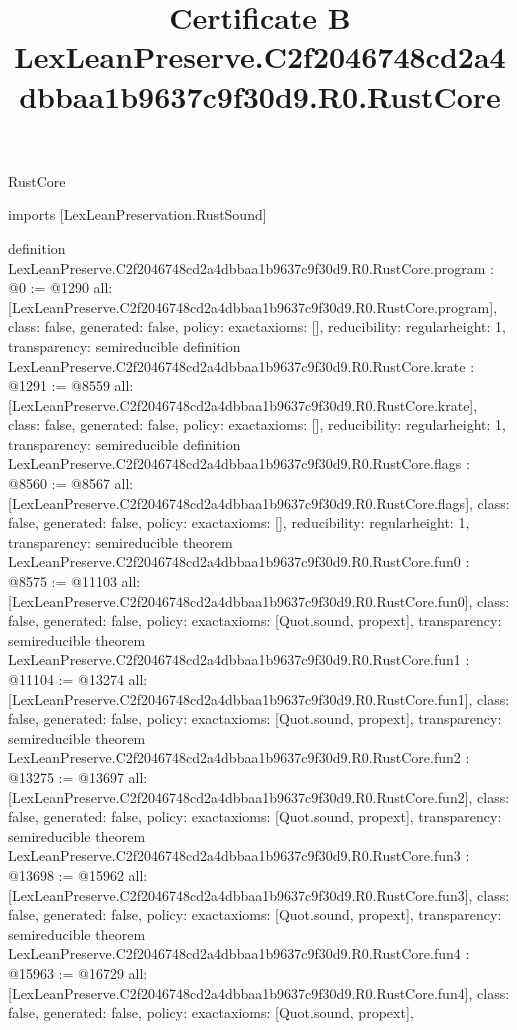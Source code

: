 \begin{lexlean}{RustCore}
\title{Certificate B LexLeanPreserve.C2f2046748cd2a4dbbaa1b9637c9f30d9.R0.RustCore}
\begin{coremodule}
imports [LexLeanPreservation.RustSound]

definition LexLeanPreserve.C2f2046748cd2a4dbbaa1b9637c9f30d9.R0.RustCore.program : @0 := @1290 {
  all: [LexLeanPreserve.C2f2046748cd2a4dbbaa1b9637c9f30d9.R0.RustCore.program],
  class: false,
  generated: false,
  policy: exact{axioms: []},
  reducibility: regular{height: 1},
  transparency: semireducible
}
definition LexLeanPreserve.C2f2046748cd2a4dbbaa1b9637c9f30d9.R0.RustCore.krate : @1291 := @8559 {
  all: [LexLeanPreserve.C2f2046748cd2a4dbbaa1b9637c9f30d9.R0.RustCore.krate],
  class: false,
  generated: false,
  policy: exact{axioms: []},
  reducibility: regular{height: 1},
  transparency: semireducible
}
definition LexLeanPreserve.C2f2046748cd2a4dbbaa1b9637c9f30d9.R0.RustCore.flags : @8560 := @8567 {
  all: [LexLeanPreserve.C2f2046748cd2a4dbbaa1b9637c9f30d9.R0.RustCore.flags],
  class: false,
  generated: false,
  policy: exact{axioms: []},
  reducibility: regular{height: 1},
  transparency: semireducible
}
theorem LexLeanPreserve.C2f2046748cd2a4dbbaa1b9637c9f30d9.R0.RustCore.fun0 : @8575 := @11103 {
  all: [LexLeanPreserve.C2f2046748cd2a4dbbaa1b9637c9f30d9.R0.RustCore.fun0],
  class: false,
  generated: false,
  policy: exact{axioms: [Quot.sound, propext]},
  transparency: semireducible
}
theorem LexLeanPreserve.C2f2046748cd2a4dbbaa1b9637c9f30d9.R0.RustCore.fun1 : @11104 := @13274 {
  all: [LexLeanPreserve.C2f2046748cd2a4dbbaa1b9637c9f30d9.R0.RustCore.fun1],
  class: false,
  generated: false,
  policy: exact{axioms: [Quot.sound, propext]},
  transparency: semireducible
}
theorem LexLeanPreserve.C2f2046748cd2a4dbbaa1b9637c9f30d9.R0.RustCore.fun2 : @13275 := @13697 {
  all: [LexLeanPreserve.C2f2046748cd2a4dbbaa1b9637c9f30d9.R0.RustCore.fun2],
  class: false,
  generated: false,
  policy: exact{axioms: [Quot.sound, propext]},
  transparency: semireducible
}
theorem LexLeanPreserve.C2f2046748cd2a4dbbaa1b9637c9f30d9.R0.RustCore.fun3 : @13698 := @15962 {
  all: [LexLeanPreserve.C2f2046748cd2a4dbbaa1b9637c9f30d9.R0.RustCore.fun3],
  class: false,
  generated: false,
  policy: exact{axioms: [Quot.sound, propext]},
  transparency: semireducible
}
theorem LexLeanPreserve.C2f2046748cd2a4dbbaa1b9637c9f30d9.R0.RustCore.fun4 : @15963 := @16729 {
  all: [LexLeanPreserve.C2f2046748cd2a4dbbaa1b9637c9f30d9.R0.RustCore.fun4],
  class: false,
  generated: false,
  policy: exact{axioms: [Quot.sound, propext]},
}
\end{coremodule}
\end{lexlean}
